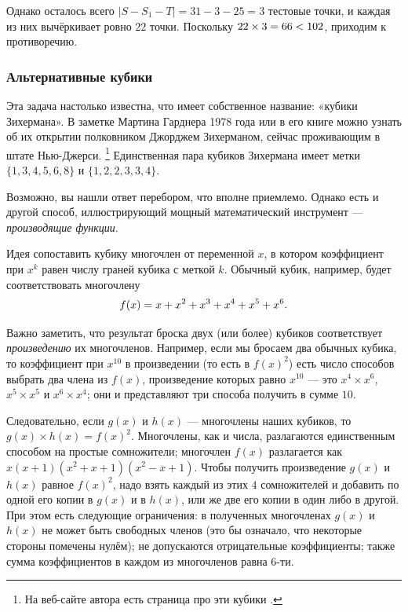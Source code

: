 Однако осталось всего $|S - S_1 - T | = 31 - 3 - 25 = 3$ тестовые точки, и каждая из них вычёркивает ровно $22$ точки.
Поскольку $22 \times 3 = 66 \z< 102$, приходим к противоречию. 

\subsubsection*{Альтернативные кубики}

Эта задача настолько известна, что имеет собственное название: «кубики Зихермана».
В заметке Мартина Гарднера 1978 года \cite{25} или в его книге \cite{28} можно узнать об их открытии полковником Джорджем Зихерманом, сейчас проживающим в штате Нью-Джерси.%
\footnote{На веб-сайте автора есть страница про эти кубики \cite{sicherman}.}
Единственная пара кубиков Зихермана имеет метки $\{1, 3, 4, 5, 6, 8\}$ и $\{1, 2, 2, 3, 3, 4\}$.

Возможно, вы нашли ответ перебором, что вполне приемлемо.
Однако есть и другой способ, иллюстрирующий мощный математический инструмент --- \emph{производящие функции}.

Идея сопоставить кубику многочлен от переменной $x$, в котором коэффициент при $x^k$ равен числу граней кубика с меткой $k$.
Обычный кубик, например, будет соответствовать многочлену 
\[f(x) \z= x \z+ x^2 \z+ x^3 \z+ x^4 \z+ x^5 \z+ x^6.\]

Важно заметить, что результат броска двух (или более) кубиков соответствует \emph{произведению} их многочленов.
Например, если мы бросаем два обычных кубика, то коэффициент при $x^{10}$ в произведении (то есть в $f(x)^2$) есть число способов выбрать два члена из $f(x)$, произведение которых равно $x^{10}$ ---
это $x^4 \times x^6$, $x^5 \times x^5$ и $x^6 \times x^4$; они и представляют три способа получить в сумме $10$.

Следовательно, если $g(x)$ и $h(x)$ --- многочлены наших кубиков, то $g(x) \times h(x) = f(x)^2$.
Многочлены, как и числа, разлагаются единственным способом на простые сомножители;
многочлен $f(x)$ разлагается как $x(x + 1)(x^2 + x + 1)(x^2 - x + 1)$.
Чтобы получить произведение $g(x)$ и $h(x)$ равное $f(x)^2$, надо взять каждый из этих $4$ сомножителей и добавить по одной его копии в $g(x)$ и в $h(x)$, или же две его копии в один либо в другой.
При этом есть следующие ограничения:
в полученных многочленах $g(x)$ и $h(x)$ не может быть свободных членов (это бы означало, что некоторые стороны помечены нулём);
не допускаются отрицательные коэффициенты;
также сумма коэффициентов в каждом из многочленов равна 6-ти.


